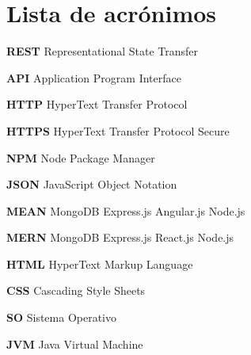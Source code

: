 \section{Lista de acrónimos}

\noindent \textbf{REST} Representational State Transfer \newline \smallskip

\noindent \textbf{API} Application Program Interface \newline \smallskip 

\noindent \textbf{HTTP} HyperText Transfer Protocol \newline \smallskip

\noindent \textbf{HTTPS} HyperText Transfer Protocol Secure \newline \smallskip

\noindent \textbf{NPM} Node Package Manager \newline \smallskip

\noindent \textbf{JSON} JavaScript Object Notation \newline \smallskip

\noindent \textbf{MEAN} MongoDB Express.js Angular.js Node.js \newline \smallskip 

\noindent \textbf{MERN} MongoDB Express.js React.js Node.js \newline \smallskip

\noindent \textbf{HTML} HyperText Markup Language \newline \smallskip

\noindent \textbf{CSS} Cascading Style Sheets \newline \smallskip

\noindent \textbf{SO} Sistema Operativo \newline \smallskip

\noindent \textbf{JVM} Java Virtual Machine \newline \smallskip